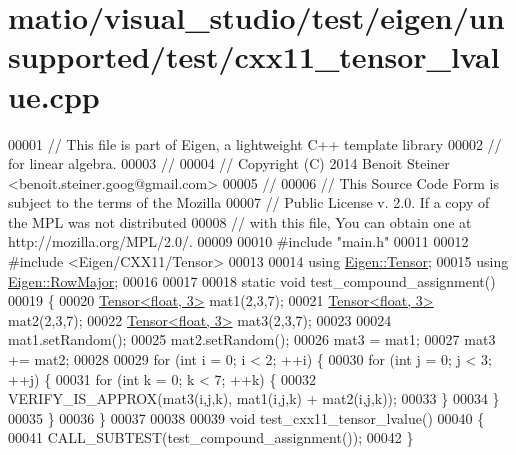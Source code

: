 \hypertarget{matio_2visual__studio_2test_2eigen_2unsupported_2test_2cxx11__tensor__lvalue_8cpp_source}{}\section{matio/visual\+\_\+studio/test/eigen/unsupported/test/cxx11\+\_\+tensor\+\_\+lvalue.cpp}
\label{matio_2visual__studio_2test_2eigen_2unsupported_2test_2cxx11__tensor__lvalue_8cpp_source}

\begin{DoxyCode}
00001 \textcolor{comment}{// This file is part of Eigen, a lightweight C++ template library}
00002 \textcolor{comment}{// for linear algebra.}
00003 \textcolor{comment}{//}
00004 \textcolor{comment}{// Copyright (C) 2014 Benoit Steiner <benoit.steiner.goog@gmail.com>}
00005 \textcolor{comment}{//}
00006 \textcolor{comment}{// This Source Code Form is subject to the terms of the Mozilla}
00007 \textcolor{comment}{// Public License v. 2.0. If a copy of the MPL was not distributed}
00008 \textcolor{comment}{// with this file, You can obtain one at http://mozilla.org/MPL/2.0/.}
00009 
00010 \textcolor{preprocessor}{#include "main.h"}
00011 
00012 \textcolor{preprocessor}{#include <Eigen/CXX11/Tensor>}
00013 
00014 \textcolor{keyword}{using} \hyperlink{class_eigen_1_1_tensor}{Eigen::Tensor};
00015 \textcolor{keyword}{using} \hyperlink{group__enums_ggaacded1a18ae58b0f554751f6cdf9eb13acfcde9cd8677c5f7caf6bd603666aae3}{Eigen::RowMajor};
00016 
00017 
00018 \textcolor{keyword}{static} \textcolor{keywordtype}{void} test\_compound\_assignment()
00019 \{
00020   \hyperlink{class_eigen_1_1_tensor}{Tensor<float, 3>} mat1(2,3,7);
00021   \hyperlink{class_eigen_1_1_tensor}{Tensor<float, 3>} mat2(2,3,7);
00022   \hyperlink{class_eigen_1_1_tensor}{Tensor<float, 3>} mat3(2,3,7);
00023 
00024   mat1.setRandom();
00025   mat2.setRandom();
00026   mat3 = mat1;
00027   mat3 += mat2;
00028 
00029   \textcolor{keywordflow}{for} (\textcolor{keywordtype}{int} i = 0; i < 2; ++i) \{
00030     \textcolor{keywordflow}{for} (\textcolor{keywordtype}{int} j = 0; j < 3; ++j) \{
00031       \textcolor{keywordflow}{for} (\textcolor{keywordtype}{int} k = 0; k < 7; ++k) \{
00032         VERIFY\_IS\_APPROX(mat3(i,j,k), mat1(i,j,k) + mat2(i,j,k));
00033       \}
00034     \}
00035   \}
00036 \}
00037 
00038 
00039 \textcolor{keywordtype}{void} test\_cxx11\_tensor\_lvalue()
00040 \{
00041   CALL\_SUBTEST(test\_compound\_assignment());
00042 \}
\end{DoxyCode}
